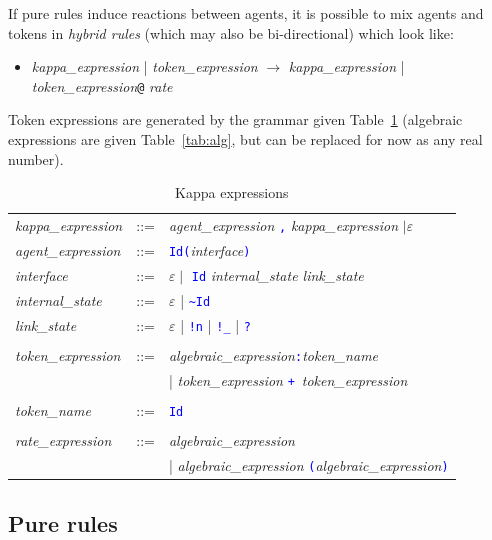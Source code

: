\documentclass[11pt]{book}
\def\int{\hbox{\texttt{\~}}}
\def\tcb#1{\textcolor{blue}{\ttt{#1}}}
\def\ttt#1{\texttt{#1}}
\def\rar{\rightarrow}
\def\ITE#1{\begin{itemize}#1\end{itemize}}
\def\imp#1{\emph{#1}\index{#1}}
\begin{document}
If pure rules induce reactions between agents, it is possible to mix agents and tokens in \imp{hybrid rules} (which may also be bi-directional) which look like:
 \ITE{
\item[] {\it kappa\_expression} | {\it token\_expression} $\rar$ {\it kappa\_expression}  | {\it token\_expression}\ttt{@} {\it rate}  
}
Token expressions are generated by the grammar given Table~\ref{tab:patterns} (algebraic expressions are given Table~\ref{tab:alg}, but can be replaced for now as any real number).
\begin{table}[htbp]
  \centering
  \caption{Kappa expressions}
  \begin{tabular}{@{} lcl @{}}
    \textit{kappa\_expression} & ::= & \textit{agent\_expression} \tcb{,} \textit{kappa\_expression} $\mid\varepsilon$ \\ 
    \textit{agent\_expression} & ::= &  \tcb{Id}\tcb{(}\textit{interface}\tcb{)} \\
    \textit{interface} &::=& $\varepsilon\mid$ \tcb{Id} \textit{internal\_state link\_state}\\
    \textit{internal\_state} &::=& $\varepsilon$ | \tcb{\int Id} \\
    \textit{link\_state} &::=& $\varepsilon$ | \tcb{!n} | \tcb{!\_} | \tcb{?}  \\\\
   \textit{token\_expression} &::=&  \textit{algebraic\_expression}\tcb{:}\textit{token\_name} \\
	&&|  \textit{token\_expression} \tcb{+}\ \textit{token\_expression} \\\\
\textit{token\_name} &::=& \tcb{Id}\\\\

    \textit{rate\_expression} &::=& \textit{algebraic\_expression} \\
&&| \textit{algebraic\_expression} \tcb{(}\textit{algebraic\_expression}\tcb{)} 
    \end{tabular}
  \label{tab:patterns}
\end{table}
\subsection{Pure rules}
\end{document}
